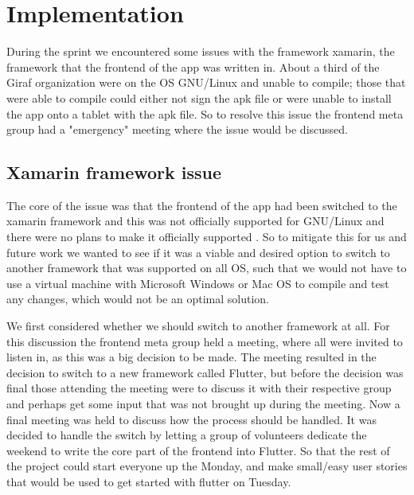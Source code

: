 \section{Implementation}
During the sprint we encountered some issues with the framework xamarin, the framework that the frontend of the app was written in. 
About a third of the Giraf organization were on the OS GNU/Linux and unable to compile; those that were able to compile could either not sign the apk file or were unable to install the app onto a tablet with the apk file.
So to resolve this issue the frontend meta group had a "emergency" meeting where the issue would be discussed.

\subsection{Xamarin framework issue}
The core of the issue was that the frontend of the app had been switched to the xamarin framework and this was not officially supported for GNU/Linux and there were no plans to make it officially supported \cite{xamarinSupport} \cite{xamarinSupport2}.
So to mitigate this for us and future work we wanted to see if it was a viable and desired option to switch to another framework that was supported on all OS, such that we would not have to use a virtual machine with Microsoft Windows or Mac OS to compile and test any changes, which would not be an optimal solution.

We first considered whether we should switch to another framework at all.
For this discussion the frontend meta group held a meeting, where all were invited to listen in, as this was a big decision to be made.
The meeting resulted in the decision to switch to a new framework called Flutter, but before the decision was final those attending the meeting were to discuss it with their respective group and perhaps get some input that was not brought up during the meeting.
Now a final meeting was held to discuss how the process should be handled.
It was decided to handle the switch by letting a group of volunteers dedicate the weekend to write the core part of the frontend into Flutter. So that the rest of the project could start everyone up the Monday, and make small/easy user stories that would be used to get started with flutter on Tuesday.

